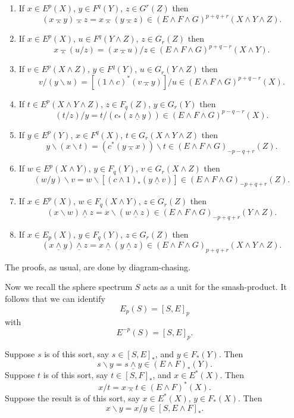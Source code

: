 \documentclass[../main]{subfiles}
\begin{document}
\begin{theorem}\label{thm:p3ch09.4}
\begin{enumerate}
    \item[(i)] If $x \in E^p(X)$, $y \in F^q(Y)$, $z \in G^r(Z)$ then \[(x \barwedge y) \barwedge z = x \barwedge (y \barwedge z) \in (E \wedge F \wedge G)^{p + q + r}(X \wedge Y \wedge Z).\]
    \item[(ii)] If $x \in E^p(X)$, $u \in F^q(Y \wedge Z)$, $z \in G_r(Z)$ then \[x \barwedge (u/z) = (x \barwedge u)/z \in (E \wedge F \wedge G)^{p + q - r}(X \wedge Y).\]
    \item[(iii)] If $v \in E^p(X \wedge Z)$, $y \in F^q(Y)$, $u \in G_r(Y \wedge Z)$ then \[v/(y \backslash u) = [(1 \wedge c)^\ast(v \barwedge y)]/u \in (E \wedge F \wedge G)^{p + q - r}(X).\]
    \item[(iv)] If $t \in E^p(X \wedge Y \wedge Z)$, $z \in F_q(Z)$, $y \in G_r(Y)$ then \[(t/z)/y = t/(c_\ast(z \underline \wedge y)) \in (E \wedge F \wedge G)^{p - q - r}(X).\]
    \item[(v)] If $y \in E^p(Y)$, $x \in F^q(X)$, $t \in G_r(X \wedge Y \wedge Z)$ then \[y \backslash (x \backslash t) = (c^\ast(y \barwedge x)) \backslash t \in (E \wedge F \wedge G)_{-p - q + r}(Z).\]
    \item[(vi)] If $w \in E^p(X \wedge Y)$, $y \in F_q(Y)$, $v \in G_r(X \wedge Z)$ then \[(w/y)\backslash v = w \backslash [(c \wedge 1)_\ast (y \underline \wedge v)] \in (E \wedge F \wedge G)_{-p + q + r}(Z).\]
    \item[(vii)] If $x \in E^p(X)$, $w \in F_q(X \wedge Y)$, $z \in G_r(Z)$ then \[(x \backslash w) \underline \wedge z = x \backslash (w \underline \wedge z) \in (E \wedge F \wedge G)_{-p + q + r}(Y \wedge Z).\]
    \item [(viii)] If $x \in E_p(X)$, $y \in F_q(Y)$, $z \in G_r(Z)$ then \[(x \underline \wedge y) \underline \wedge z = x \underline \wedge (y \underline \wedge z) \in (E \wedge F \wedge G)_{p + q + r}(X \wedge Y \wedge Z).\]
\end{enumerate}
\end{theorem}

The proofs, as usual, are done by diagram-chasing. 

Now we recall the sphere spectrum $S$ acts as a unit for the smash-product. It follows that we can identify \[E_p(S) = [S, E]_p\] with \[E^{-p}(S) = [S, E]_p.\]

\begin{proposition}\label{prop:p3ch09.5}
Suppose $s$ is of this sort, say $s \in [S, E]_\ast$, and $y \in F_\ast(Y)$. Then \[s \backslash y = s \underline\wedge y \in (E \wedge F)_\ast(Y).\] Suppose $t$ is of this sort, say $t \in [S, F]_\ast$, and $x \in E^\ast(X)$. Then \[x/t = x \barwedge t \in (E \wedge F)^\ast(X).\] Suppose the result is of this sort, say $x \in E^\ast(X)$, $y \in F_\ast(X)$. Then \[x \backslash y = x/y \in [S, E \wedge F]_\ast.\]
\end{proposition}
\end{document}
